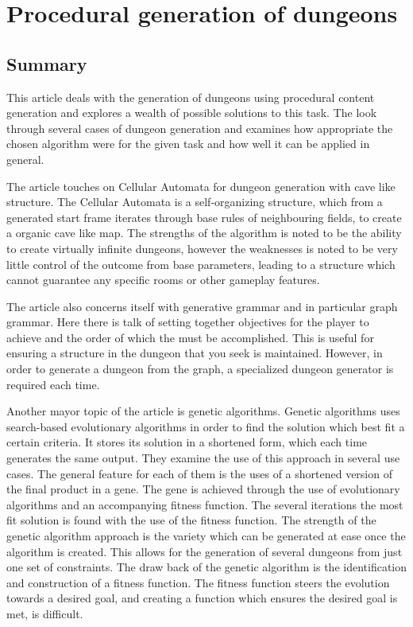 \documentclass[a4paper,11pt]{article}
\begin{document}
\section{Procedural generation of dungeons}
\subsection{Summary}
This article deals with the generation of dungeons using procedural content generation and explores a wealth of possible solutions to this task.
The look through several cases of dungeon generation and examines how appropriate the chosen algorithm were for the given task and how well it can be applied in general. 

The article touches on Cellular Automata for dungeon generation with cave like structure. The Cellular Automata is a self-organizing structure, which from a generated start frame iterates through base rules of neighbouring fields, to create a organic cave like map. The strengths of the algorithm is noted to be the ability to create virtually infinite dungeons, however the weaknesses is noted to be very little control of the outcome from base parameters, leading to a structure which cannot guarantee any specific rooms or other gameplay features.

The article also concerns itself with generative grammar and in particular graph grammar. Here there is talk of setting together objectives for the player to achieve and the order of which the must be accomplished. This is useful for ensuring a structure in the dungeon that you seek is maintained. However, in order to generate a dungeon from the graph, a specialized dungeon generator is required each time. 

Another mayor topic of the article is genetic algorithms. Genetic algorithms uses search-based evolutionary algorithms in order to find the solution which best fit a certain criteria. It stores its solution in a shortened form, which each time generates the same output. 
They examine the use of this approach in several use cases. The general feature for each of them is the uses of a shortened version of the final product in a gene. The gene is achieved through the use of evolutionary algorithms and an accompanying fitness function. The several iterations the most fit solution is found with the use of the fitness function. 
The strength of the genetic algorithm approach is the variety which can be generated at ease once the algorithm is created. This allows for the generation of several dungeons from just one set of constraints. The draw back of the genetic algorithm is the identification and construction of a fitness function. The fitness function steers the evolution towards a desired goal, and creating a function which ensures the desired goal is met, is difficult. 
\end{document}
